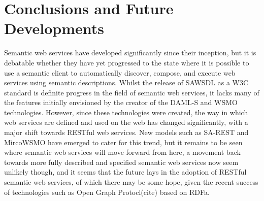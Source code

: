 \section{Conclusions and Future Developments}

Semantic web services have developed significantly since their inception, but it
is debatable whether they have yet progressed to the state where it is possible
to use a semantic client to automatically discover, compose, and execute web
services using semantic descriptions. Whilst the release of SAWSDL as a W3C
standard is definite progress in the field of semantic web services, it lacks
many of the features initially envisioned by the creator of the DAML-S and WSMO
technologies. However, since these technologies were created, the way in which
web services are defined and used on the web has changed significantly, with a
major shift towards RESTful web services. New models such as SA-REST and
MircoWSMO have emerged to cater for this trend, but it remains to be seen where
semantic web services will move forward from here, a movement back towards more
fully described and specified semantic web services now seem unlikely though,
and it seems that the future lays in the adoption of RESTful semantic web
services, of which there may be some hope, given the recent success of
technologies such as Open Graph Protocl(cite) based on RDFa.

